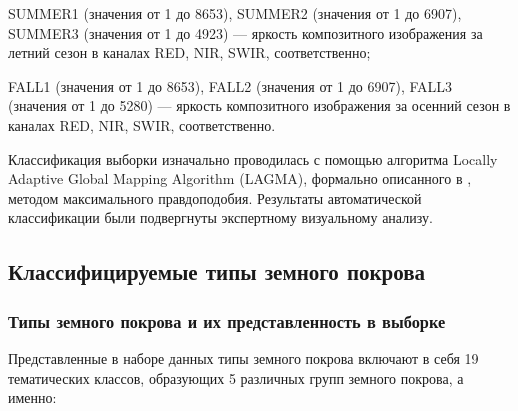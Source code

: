 \documentclass[14pt, a4paper, oneside]{extarticle}
\begin{document}
SUMMER1 (значения от 1 до 8653), SUMMER2 (значения от 1 до 6907), SUMMER3 (значения от 1 до 4923) --- яркость композитного изображения за летний сезон в каналах RED, NIR, SWIR, соответственно;

FALL1 (значения от 1 до 8653), FALL2 (значения от 1 до 6907), FALL3 (значения от 1 до 5280) --- яркость композитного изображения за осенний сезон в каналах RED, NIR, SWIR, соответственно.

Классификация выборки изначально проводилась с помощью алгоритма Locally Adaptive Global Mapping Algorithm (LAGMA), формально описанного в \cite{land-cover-mapping-monograph}, методом максимального правдоподобия. Результаты автоматической классификации были подвергнуты экспертному визуальному анализу.

\subsection{Классифицируемые типы земного покрова}
\subsubsection{Типы земного покрова и их представленность в выборке}
Представленные в наборе данных типы земного покрова включают в себя 19 тематических классов, образующих 5 различных групп земного покрова, а именно:
\end{document}
